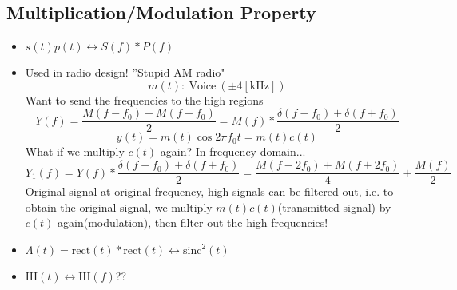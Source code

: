 \documentclass{article}
\begin{document}
\subsection{Multiplication/Modulation Property}
\begin{itemize}
    \item $s(t)p(t)\leftrightarrow S(f)*P(f)$
    \item Used in radio design! ''Stupid AM radio"
    \[m(t):\:\mathrm{Voice}\:(\pm4[\mathrm{kHz}])
    \]
    Want to send the frequencies to the high regions
    \[
    Y(f)=\frac{M(f-f_0)+M(f+f_0)}{2}=M(f)*\frac{\delta(f-f_0)+\delta(f+f_0)}{2}
    \]
    \[
    y(t)=m(t)\cos{2\pi f_0t}=m(t)c(t)
    \]
    What if we multiply $c(t)$ again? In frequency domain...
    \[
    Y_1(f)=Y(f)*\frac{\delta(f-f_0)+\delta(f+f_0)}{2}=\frac{M(f-2f_0)+M(f+2f_0)}{4}+\frac{M(f)}{2}
    \]
    Original signal at original frequency, high signals can be filtered out, i.e. to obtain the original signal, we multiply $m(t)c(t)$(transmitted signal) by $c(t)$ again(modulation), then filter out the high frequencies!
    \item $\Lambda(t)=\mathrm{rect}(t)*\mathrm{rect}(t)\leftrightarrow \mathrm{sinc}^2(t)$
    \item $\mathrm{III}(t)\leftrightarrow\mathrm{III}(f)$??
\end{itemize}
\end{document}
